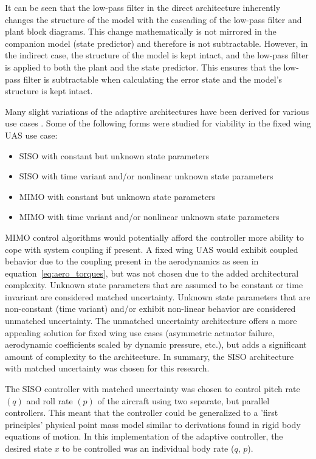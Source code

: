  It can be seen that the low-pass filter in the direct architecture inherently changes the structure of the model with the cascading of the low-pass filter and plant block diagrams.  This change mathematically is not mirrored in the companion model (state predictor) and therefore is not subtractable.  However, in the indirect case, the structure of the model is kept intact, and the low-pass filter is applied to both the plant and the state predictor.  This ensures that the low-pass filter is subtractable when calculating the error state and the model's structure is kept intact.

Many slight variations of the \Lone adaptive architectures have been derived for various use cases \cite{hovakimyan2010l1}.  Some of the following forms were studied for viability in the fixed wing \ac{UAS} use case:
\begin{itemize}
 \item \ac{SISO} with constant but unknown state parameters
 \item \ac{SISO} with time variant and/or nonlinear unknown state parameters
 \item \ac{MIMO} with constant but unknown state parameters
 \item \ac{MIMO} with time variant and/or nonlinear unknown state parameters
\end{itemize}

\ac{MIMO} control algorithms would potentially afford the controller more ability to cope with system coupling if present.  A fixed wing \ac{UAS} would exhibit coupled behavior due to the coupling present in the aerodynamics as seen in equation~\ref{eq:aero_torques}, but was not chosen due to the added architectural complexity.  Unknown state parameters that are assumed to be constant or time invariant are considered matched uncertainty.  Unknown state parameters that are non-constant (time variant) and/or exhibit non-linear behavior are considered unmatched uncertainty.  The unmatched uncertainty architecture offers a more appealing solution for fixed wing use cases (asymmetric actuator failure, aerodynamic coefficients scaled by dynamic pressure, etc.), but adds a significant amount of complexity to the architecture.  In summary, the \ac{SISO} architecture with matched uncertainty was chosen for this research.  

The \ac{SISO} controller with matched uncertainty was chosen to control pitch rate $(q)$ and roll rate $(p)$ of the aircraft using two separate, but parallel controllers.  This meant that the controller could be generalized to a 'first principles' physical point mass model similar to derivations found in rigid body equations of motion.  In this implementation of the \Lone adaptive controller, the desired state $x$ to be controlled was an individual body rate (\eg $q$, $p$). 

